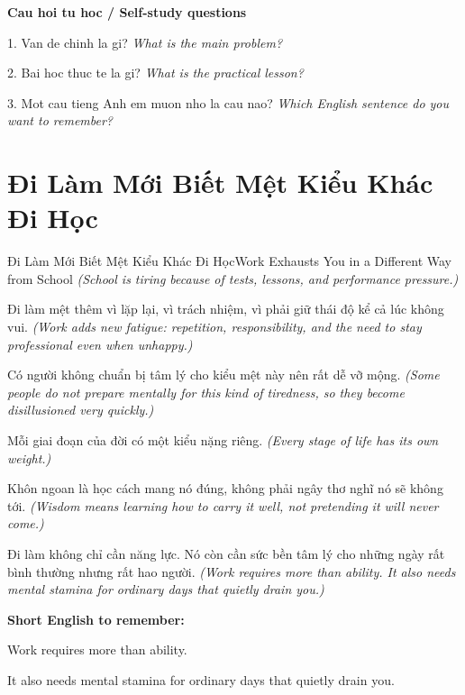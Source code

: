 \begin{tuhocnhanh}
\textbf{Cau hoi tu hoc / Self-study questions}

1. Van de chinh la gi? \textit{What is the main problem?}

2. Bai hoc thuc te la gi? \textit{What is the practical lesson?}

3. Mot cau tieng Anh em muon nho la cau nao? \textit{Which English sentence do you want to remember?}
\end{tuhocnhanh}
\ngancach

\section{Đi Làm Mới Biết Mệt Kiểu Khác Đi Học}
\begin{truyen}{Đi Làm Mới Biết Mệt Kiểu Khác Đi Học}{Work Exhausts You in a Different Way from School}
\textit{(School is tiring because of tests, lessons, and performance pressure.)}

Đi làm mệt thêm vì lặp lại, vì trách nhiệm, vì phải giữ thái độ kể cả lúc không vui.
\textit{(Work adds new fatigue: repetition, responsibility, and the need to stay professional even when unhappy.)}

Có người không chuẩn bị tâm lý cho kiểu mệt này nên rất dễ vỡ mộng.
\textit{(Some people do not prepare mentally for this kind of tiredness, so they become disillusioned very quickly.)}

Mỗi giai đoạn của đời có một kiểu nặng riêng.
\textit{(Every stage of life has its own weight.)}

Khôn ngoan là học cách mang nó đúng, không phải ngây thơ nghĩ nó sẽ không tới.
\textit{(Wisdom means learning how to carry it well, not pretending it will never come.)}

\end{truyen}

\begin{baihoc}
Đi làm không chỉ cần năng lực. Nó còn cần sức bền tâm lý cho những ngày rất bình thường nhưng rất hao người.
\textit{(Work requires more than ability. It also needs mental stamina for ordinary days that quietly drain you.)}
\end{baihoc}

\begin{ghinhoanh}
\textbf{Short English to remember:}

Work requires more than ability.

It also needs mental stamina for ordinary days that quietly drain you.

\end{ghinhoanh}

